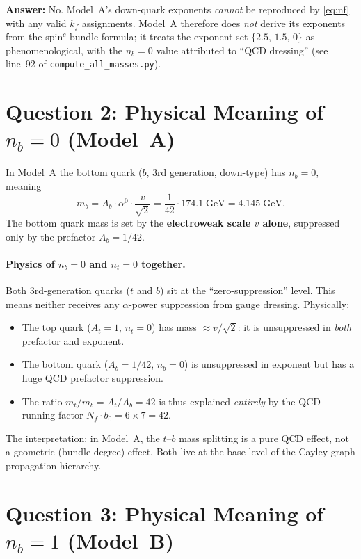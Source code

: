 \documentclass[11pt]{article}
\begin{document}
\textbf{Answer:} No.  Model~A's down-quark exponents \emph{cannot} be
reproduced by \eqref{eq:nf} with any valid $k_f$ assignments.  Model~A
therefore does \emph{not} derive its exponents from the spin$^c$ bundle
formula; it treats the exponent set $\{2.5,\,1.5,\,0\}$ as
phenomenological, with the $n_b=0$ value attributed to ``QCD dressing''
(see line~92 of \texttt{compute\_all\_masses.py}).

\section{Question 2: Physical Meaning of $n_b = 0$ (Model~A)}

In Model~A the bottom quark ($b$, 3rd generation, down-type) has
$n_b=0$, meaning
\[
  m_b = A_b \cdot \alpha^0 \cdot \frac{v}{\sqrt{2}}
       = \frac{1}{42}\cdot 174.1\;\mathrm{GeV}
       = 4.145\;\mathrm{GeV}.
\]
The bottom quark mass is set by the \textbf{electroweak scale $v$ alone},
suppressed only by the prefactor $A_b = 1/42$.

\paragraph{Physics of $n_b=0$ and $n_t=0$ together.}
Both 3rd-generation quarks ($t$ and $b$) sit at the ``zero-suppression''
level.  This means neither receives any $\alpha$-power suppression from
gauge dressing.  Physically:
\begin{itemize}
  \item The top quark ($A_t=1$, $n_t=0$) has mass $\approx v/\sqrt{2}$:
    it is unsuppressed in \emph{both} prefactor and exponent.
  \item The bottom quark ($A_b=1/42$, $n_b=0$) is unsuppressed in exponent
    but has a huge QCD prefactor suppression.
  \item The ratio $m_t/m_b = A_t/A_b = 42$ is thus explained
    \emph{entirely} by the QCD running factor $N_f \cdot b_0 = 6 \times 7
    = 42$.
\end{itemize}

The interpretation: in Model~A, the $t$--$b$ mass splitting is a pure QCD
effect, not a geometric (bundle-degree) effect.  Both live at the base
level of the Cayley-graph propagation hierarchy.

\section{Question 3: Physical Meaning of $n_b = 1$ (Model~B)}
\end{document}
